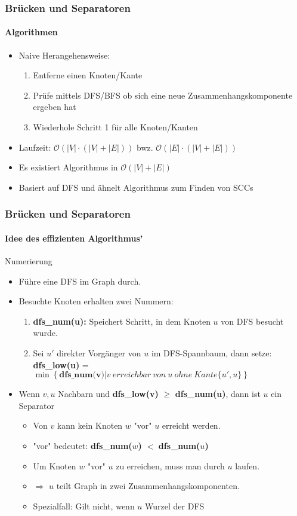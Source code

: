 \begin{frame}
	\frametitle{Brücken und Separatoren}
	\framesubtitle{Algorithmen}
	\begin{itemize}
		\item Naive Herangehensweise:
			\begin{enumerate}
				\item Entferne einen Knoten/Kante
				\item Prüfe mittels DFS/BFS ob sich eine neue Zusammenhangskomponente ergeben hat
				\item Wiederhole Schritt 1 für alle Knoten/Kanten
			\end{enumerate}
			\item Laufzeit: $\mathcal{O}(|V| \cdot (|V| + |E|))$ bwz. $\mathcal{O}(|E| \cdot (|V| + |E|))$
			\item Es existiert Algorithmus  in  $\mathcal{O}(|V| + |E|)$
			\item Basiert auf DFS und ähnelt Algorithmus zum Finden von SCCs
	\end{itemize}
\end{frame}
\begin{frame}
	\frametitle{Brücken und Separatoren}
	\framesubtitle{Idee des effizienten Algorithmus'}
	\begin{KITinfoblock}{Numerierung}
	\begin{itemize}
		\item Führe eine DFS im Graph durch.
		\item Besuchte Knoten erhalten zwei Nummern:
		
			\begin{enumerate}
				\item \textbf{dfs\_num(u):} Speichert Schritt, in dem Knoten $u$ von DFS besucht wurde.
				\item  Sei $u'$ direkter Vorgänger von $u$ im DFS-Spannbaum, dann setze: \newline \textbf{dfs\_low(u)} = $\min \left \{\textbf{dfs\_num(v)} | v \ erreichbar \ von \ u \ ohne \ Kante \{u',u\} \right \}$ 
			\end{enumerate}
\end{itemize}
\end{KITinfoblock}
	\begin{itemize}		
			\pause
			\item Wenn $v,u$ Nachbarn und \textbf{dfs\_low(v)} $\geq$ \textbf{dfs\_num(u)}, dann ist $u$ ein Separator 
			\pause
			\begin{itemize}
				 \item Von $v$ kann kein Knoten $w$ "vor" $u$ erreicht werden.
				 \item "vor" bedeutet: \textbf{dfs\_num($w$)} $<$ \textbf{dfs\_num($u$)}
				 \item Um Knoten $w$ "vor" $u$ zu erreichen, muss man durch $u$ laufen.
				 \item $\Rightarrow$ $u$ teilt Graph in zwei Zusammenhangskomponenten.
				 \item Spezialfall: Gilt nicht, wenn $u$ Wurzel der DFS
			\end{itemize} 
	\end{itemize}
\end{frame}
